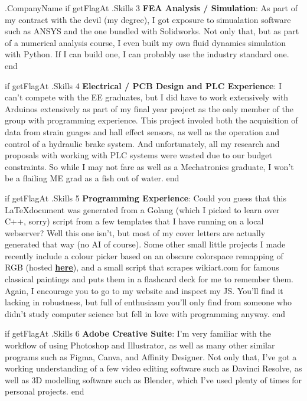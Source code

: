 \documentclass[10pt]{letter}
\begin{document}
\begin{letter}{
    {{ .CompanyName }}
}
{{ if getFlagAt .Skills 3 }}
\textbf{FEA Analysis / Simulation}: As part of my contract with the devil (my degree), I got exposure to simualation software such as  ANSYS and the one bundled with Solidworks. Not only that, but as part of a numerical analysis course, I even built my own fluid dynamics simulation with Python. If I can build one, I can probably use the industry standard one. 
{{ end }}

{{ if getFlagAt .Skills 4 }}
\textbf{Electrical / PCB Design and PLC Experience}: I can't compete with the EE graduates, but I did have to work extensively with Arduinos extensively as part of my final year project as the only member of the group with programming experience. This project involed both the acquisition of data from strain guages and hall effect sensors, as well as the operation and control of a hydraulic brake system. And unfortunately, all my research and proposals with working with PLC systems were wasted due to our budget constraints. So while I may not fare as well as a Mechatronics graduate, I won't be a flailing ME grad as a fish out of water. 
{{ end }}

{{ if getFlagAt .Skills 5 }}
\textbf{Programming Experience}: Could you guess that this \LaTeX document was generated from a Golang (which I picked to learn over C++, sorry) script from a few templates that I have running on a local webserver? Well this one isn't, but most of my cover letters are actually generated that way (no AI of course). Some other small little projects I made recently include a colour picker based on an obscure colorspace remapping of RGB (hosted \underline{\textbf{\href{https://zabuzabuzazaa.xyz/home/ok_palette/}{here}}}), and a small script that scrapes wikiart.com for famous classical paintings and puts them in a flashcard deck for me to remember them. Again, I encourage you to go to my website and inspect my JS. You'll find it lacking in robustness, but full of enthusiasm you'll only find from someone who didn't study computer science but fell in love with programming anyway. 
{{ end }}

{{ if getFlagAt .Skills 6 }}
\textbf{Adobe Creative Suite}: I'm very familiar with the workflow of using Photoshop and Illustrator, as well as many other similar programs such as Figma, Canva, and Affinity Designer. Not only that, I've got a working understanding of a few video editing software such as Davinci Resolve, as well as 3D modelling software such as Blender, which I've used plenty of times for personal projects. 
{{ end }}


\end{letter}
\end{document}
